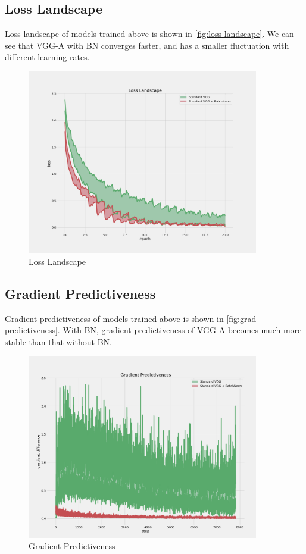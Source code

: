 \documentclass[10pt]{article}
\begin{document}
\subsection{Loss Landscape}

Loss landscape of models trained above is shown in \autoref{fig:loss-landscape}. We can see that VGG-A with BN converges faster, and has a smaller fluctuation with different learning rates.

\begin{figure}[htb]
  \centering
  \includegraphics[width=0.9\textwidth]{figures/loss_landscape.png}
  \caption{%
    Loss Landscape}
  \label{fig:loss-landscape}
\end{figure}

\subsection{Gradient Predictiveness}

Gradient predictiveness of models trained above is shown in \autoref{fig:grad-predictiveness}. With BN, gradient predictiveness of VGG-A becomes much more stable than that without BN.

\begin{figure}[htb]
  \centering
  \includegraphics[width=0.9\textwidth]{figures/grad_predictiveness.png}
  \caption{%
    Gradient Predictiveness}
  \label{fig:grad-predictiveness}
\end{figure}
\end{document}
